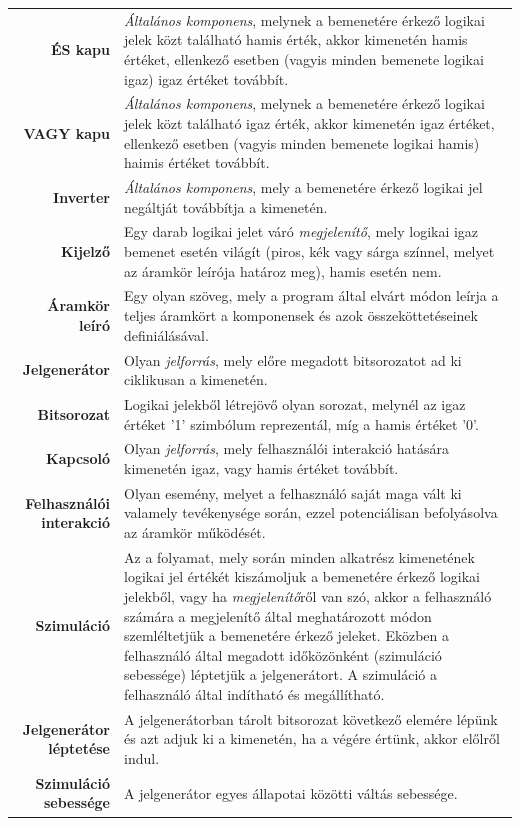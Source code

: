 \begin{longtable}{r p{10.95cm}}
\textbf{ÉS kapu} & \emph{Általános komponens}, melynek a bemenetére érkező logikai jelek közt található hamis érték, akkor kimenetén hamis értéket, ellenkező esetben (vagyis minden bemenete logikai igaz) igaz értéket továbbít. \\
\textbf{VAGY kapu} & \emph{Általános komponens}, melynek a bemenetére érkező logikai jelek közt található igaz érték, akkor kimenetén igaz értéket, ellenkező esetben (vagyis minden bemenete logikai hamis) haimis értéket továbbít. \\
\textbf{Inverter} & \emph{Általános komponens}, mely a bemenetére érkező logikai jel negáltját továbbítja a kimenetén. \\
\textbf{Kijelző} & Egy darab logikai jelet váró \emph{megjelenítő}, mely logikai igaz bemenet esetén világít (piros, kék vagy sárga színnel, melyet az áramkör leírója határoz meg), hamis esetén nem. \\
\textbf{Áramkör leíró} & Egy olyan szöveg, mely a program által elvárt módon leírja a teljes áramkört a komponensek és azok összeköttetéseinek definiálásával. \\
\textbf{Jelgenerátor} & Olyan \emph{jelforrás}, mely előre megadott bitsorozatot ad ki ciklikusan a kimenetén.\\
\textbf{Bitsorozat} & Logikai jelekből létrejövő olyan sorozat, melynél az igaz értéket ’1’ szimbólum reprezentál, míg a hamis értéket ’0’.\\
\textbf{Kapcsoló} & Olyan \emph{jelforrás}, mely felhasználói interakció hatására kimenetén igaz, vagy hamis értéket továbbít. \\
\textbf{Felhasználói interakció} & Olyan esemény, melyet a felhasználó saját maga vált ki valamely tevékenysége során, ezzel potenciálisan befolyásolva az áramkör működését. \\
\textbf{Szimuláció} & Az a folyamat, mely során minden alkatrész kimenetének logikai jel értékét kiszámoljuk a bemenetére érkező logikai jelekből, vagy ha \emph{megjelenítő}ről van szó, akkor a felhasználó számára a megjelenítő által meghatározott módon szemléltetjük a bemenetére érkező jeleket. Eközben a felhasználó által megadott időközönként (szimuláció sebessége) léptetjük a jelgenerátort. A szimuláció a felhasználó által indítható és megállítható.\\
\textbf{Jelgenerátor léptetése} & A jelgenerátorban tárolt bitsorozat következő elemére lépünk és azt adjuk ki a kimenetén, ha a végére értünk, akkor előlről indul.\\
\textbf{Szimuláció sebessége} & A jelgenerátor egyes állapotai közötti váltás sebessége. \\

\end{longtable}
